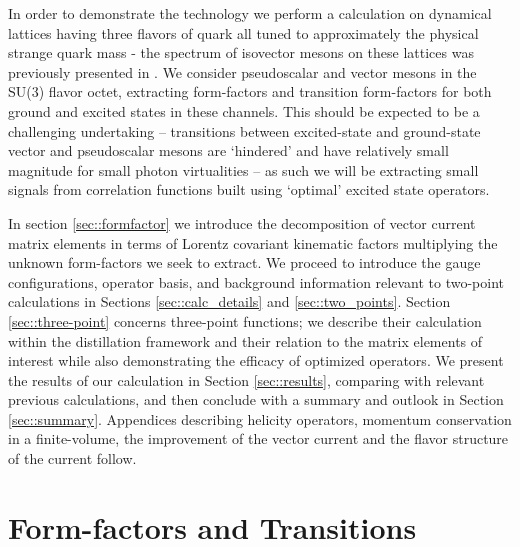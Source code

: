 \documentclass[twocolumn,amsmath,amssymb,prd,10pt,floatfix, 
superscriptaddress,nofootinbib, showpacs, preprintnumbers]{revtex4-1}
\begin{document}
In order to demonstrate the technology we perform a calculation on dynamical lattices having three flavors of quark all tuned to approximately the physical strange quark mass - the spectrum of isovector mesons on these lattices was previously presented in \cite{Dudek:2009qf, Dudek:2010wm}. We consider pseudoscalar and vector mesons in the SU(3) flavor octet, extracting form-factors and transition form-factors for both ground and excited states in these channels. This should be expected to be a challenging undertaking -- transitions between excited-state and ground-state vector and pseudoscalar mesons are `hindered' and have relatively small magnitude for small photon virtualities -- as such we will be extracting small signals from correlation functions built using `optimal' excited state operators.

In section \ref{sec::formfactor} we introduce the decomposition of vector current matrix elements in terms of Lorentz covariant kinematic factors multiplying the unknown form-factors we seek to extract. We proceed to introduce the gauge configurations, operator basis, and background information relevant to two-point calculations in Sections \ref{sec::calc_details} and \ref{sec::two_points}.  Section \ref{sec::three-point} concerns three-point functions; we describe their calculation within the distillation framework and their relation to the matrix elements of interest while also demonstrating the efficacy of optimized operators. We present the results of our calculation in Section \ref{sec::results}, comparing with relevant previous calculations, and then conclude with a summary and outlook in Section \ref{sec::summary}. Appendices describing helicity operators, momentum conservation in a finite-volume, the improvement of the vector current and the flavor structure of the current follow.






%
\section{Form-factors and Transitions \label{sec::formfactor}}
\end{document}
